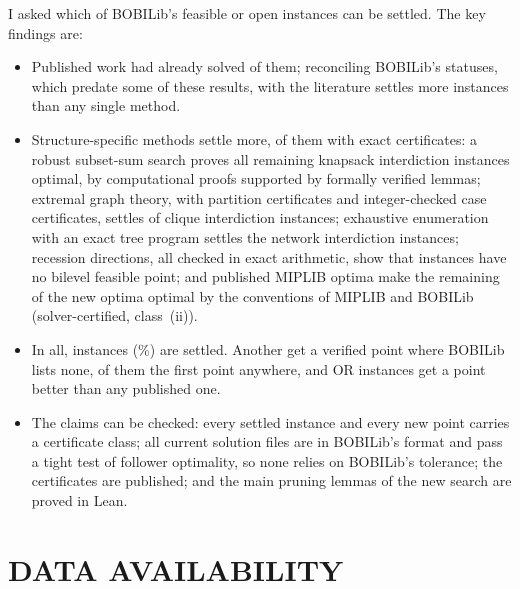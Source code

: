 \documentclass[]{spie}  %
\theoremstyle{plain}
\newcommand{\cls}[1]{class~(#1)}             %
\begin{document}
I asked which of BOBILib's \NumUnsolved{} feasible or open instances can be settled. The key
findings are:
\begin{itemize}
\item Published work had already solved \NumLitOptimal{} of them; reconciling BOBILib's statuses,
which predate some of these results, with the literature settles more instances than any single
method.
\item Structure-specific methods settle \NumSettledHere{} more, \NumClassExactSettled{} of them
with exact certificates: a robust subset-sum search proves all \NumNewKip{} remaining knapsack
interdiction instances optimal, by computational proofs supported by formally verified lemmas;
extremal graph theory, with partition certificates and \NumCliquePartCases{} integer-checked case
certificates, settles \NumNewClique{} of \NumCliqueSet{} clique interdiction instances; exhaustive
enumeration with an exact tree program settles the \NumNewNetwork{} network interdiction
instances; recession directions, all checked in exact arithmetic, show that \NumNoFeasible{}
instances have no bilevel feasible point; and published MIPLIB optima make the remaining
\NumNewHpr{} of the \NumNewOptimal{} new optima optimal by the conventions of MIPLIB and BOBILib
(solver-certified, \cls{ii}).
\item In all, \NumSettled{} instances (\PctSettled\%) are settled. Another \NumFirstPoint{} get a
verified point where BOBILib lists none, \NumFirstAnywhere{} of them the first point anywhere, and
\NumOrBetter{} OR instances get a point better than any published one.
\item The claims can be checked: every settled instance and every new point carries a certificate
class; all \NumTightFiles{} current solution files are in BOBILib's format and pass a tight test of
follower optimality, so none relies on BOBILib's tolerance; the certificates are published; and the
main pruning lemmas of the new search are proved in Lean.
\end{itemize}

\section*{DATA AVAILABILITY}
\end{document}
